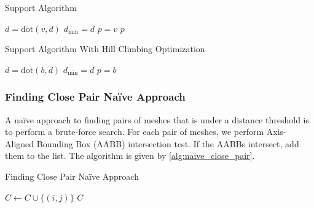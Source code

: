 \documentclass[12pt,fleqn]{article}
\begin{document}
\begin{algorithm}
    \caption{Support Algorithm}
    \begin{algorithmic}[1]
            \STATE $d = \text{dot}(v, d)$
                \STATE $d_\text{min} = d$
                \STATE $p = v$
            \ENDIF
        \ENDFOR
        \RETURN $p$
    \end{algorithmic}
    \label{alg:support}
\end{algorithm}

\begin{algorithm}
    \caption{Support Algorithm With Hill Climbing Optimization}
    \begin{algorithmic}[1]
                \STATE $d = \text{dot}(b, d)$
                    \STATE $d_\text{min} = d$
                    \STATE $p = b$
                \ENDIF
            \ENDFOR
        \ENDWHILE
    \end{algorithmic}
    \label{alg:hcsupport}
\end{algorithm}

\subsubsection{Finding Close Pair Naïve Approach}
A naïve approach to finding pairs of meshes that is under a distance threshold is to perform a brute-force search. For each pair of meshes, we perform Axis-Aligned Bounding Box (AABB) intersection test. If the AABBs intersect, add them to the list. The algorithm is given by \ref{alg:naive_close_pair}.

\begin{algorithm}
    \caption{Finding Close Pair Naïve Approach}
    \begin{algorithmic}[1]
                        \STATE $C \leftarrow C \cup \{(i, j)\}$
                    \ENDIF
                \ENDIF
            \ENDFOR
        \ENDFOR
        \RETURN $C$
    \end{algorithmic}
    \label{alg:naive_close_pair}
\end{algorithm}
\end{document}
